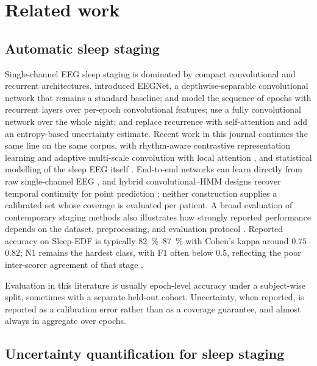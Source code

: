 \section{Related work}
\label{sec:related}

\subsection{Automatic sleep staging}
\label{sec:related-staging}

Single-channel EEG sleep staging is dominated by compact convolutional and
recurrent architectures. \citet{lawhern2018} introduced EEGNet, a
depthwise-separable convolutional network that remains a standard baseline;
\citet{supratak2017} and \citet{phan2019seqsleepnet} model the sequence of
epochs with recurrent layers over per-epoch convolutional features;
\citet{perslev2021} use a fully convolutional network over the whole night;
and \citet{phan2022sleepformer} replace recurrence with self-attention and
add an entropy-based uncertainty estimate. Recent work in this journal
continues the same line on the same corpus, with rhythm-aware contrastive
representation learning \citep{zhou2026bspc} and adaptive multi-scale
convolution with local attention \citep{fan2025bspc}, and statistical
modelling of the sleep EEG itself \citep{hatamoto2025}. End-to-end networks
can learn directly from raw single-channel EEG \citep{li2021endtoend}, and
hybrid convolutional--HMM designs recover temporal continuity for point
prediction \citep{yang2021hmm}; neither construction supplies a calibrated
set whose coverage is evaluated per patient. A broad evaluation of
contemporary staging methods also illustrates how strongly reported
performance depends on the dataset, preprocessing, and evaluation protocol
\citep{sarkar2022evaluation}. Reported accuracy on
Sleep-EDF is typically \SIrange{82}{87}{\percent} with Cohen's kappa around
$0.75$--$0.82$; N1 remains the hardest class, with F1 often below $0.5$,
reflecting the poor inter-scorer agreement of that stage
\citep{rosenberg2013}.

Evaluation in this literature is usually epoch-level accuracy under a
subject-wise split, sometimes with a separate held-out cohort. Uncertainty,
when reported, is reported as a calibration error
\citep{guo2017,phan2022sleepformer} rather than as a coverage guarantee, and
almost always in aggregate over epochs.

\subsection{Uncertainty quantification for sleep staging}
\label{sec:related-uq}

